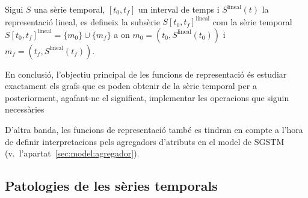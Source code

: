 \begin{definition}
  \label{def:sgst:interval-temporal-lineal}
  Sigui $S$ una sèrie temporal, $[t_0,t_f]$ un interval de temps i
  $S^\text{lineal}(t)$ la representació lineal, es defineix la subsèrie
  $S[t_0,t_f]^{\text{lineal}}$ com la sèrie temporal
  $S[t_0,t_f]^{\text{lineal}} = \{m_0\} \cup \{m_f\}$ a
  on $m_0=(t_0,S^{\text{lineal}}(t_0))$ i $m_f=(t_f,S^{\text{lineal}}(t_f))$.
\end{definition}





En conclusió, l'objectiu principal de les funcions de representació és
estudiar exactament els grafs que es poden obtenir de la sèrie
temporal per a posteriorment, agafant-ne el significat, implementar
les operacions que siguin necessàries


D'altra banda, les funcions de representació també es tindran en
compte a l'hora de definir interpretacions pels agregadors d'atributs
en el model de SGSTM (v.\ l'apartat~\ref{sec:model:agregador}).











\subsection{Patologies de les sèries temporals}
\label{sec:sgst:patologies}

